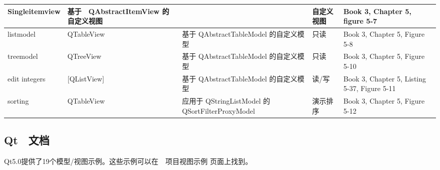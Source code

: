 \begin{longtable}{|m{15em}|l|l|l|m{15em}|}
\hline
Singleitemview	& 基于　QAbstractItemView 的自定义视图	&&	自定义视图	&Book 3, Chapter 5, figure 5-7 \\ 
\hline
listmodel &	QTableView	&基于 QAbstractTableModel 的自定义模型	&只读&	Book 3, Chapter 5, Figure 5-8 \\ 
\hline
treemodel	& QTreeView	& 基于 QAbstractTableModel 的自定义模型	&只读	&Book 3, Chapter 5, Figure 5-10 \\ 
\hline
edit integers &	[QListView]	& 基于 QAbstractTableModel 的自定义模型	 & 读/写	& Book 3, Chapter 5, Listing 5-37, Figure 5-11 \\ 
\hline
sorting	 & QTableView	& 应用于 QStringListModel 的 QSortFilterProxyModel	& 演示排序	& Book 3, Chapter 5, Figure 5-12 \\ 
\hline
\end{longtable}

\subsection{Qt　文档}

Qt5.0提供了19个模型/视图示例。这些示例可以在　项目视图示例 页面上找到。


